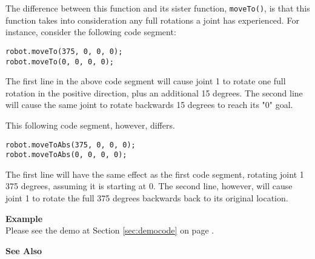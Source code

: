The difference between this function and its sister function, \texttt{moveTo()},
is that this function takes into consideration any full rotations a joint has 
experienced. For instance, consider the following code segment:
\begin{verbatim}
robot.moveTo(375, 0, 0, 0);
robot.moveTo(0, 0, 0, 0);
\end{verbatim}
The first line in the above code segment will cause joint 1 to rotate one full
rotation in the positive direction, plus an additional 15 degrees. The second
line will cause the same joint to rotate backwards 15 degrees to reach its "0"
goal.

This following code segment, however, differs.
\begin{verbatim}
robot.moveToAbs(375, 0, 0, 0);
robot.moveToAbs(0, 0, 0, 0);
\end{verbatim}
The first line will have the same effect as the first code segment, rotating
joint 1 375 degrees, assuming it is starting at 0. The second line, however,
will cause joint 1 to rotate the full 375 degrees backwards back to its original 
location.

\noindent
{\bf Example}\\
Please see the demo at Section \ref{sec:democode} on page \pageref{sec:democode}.\\
\noindent

\noindent
{\bf See Also}\\

